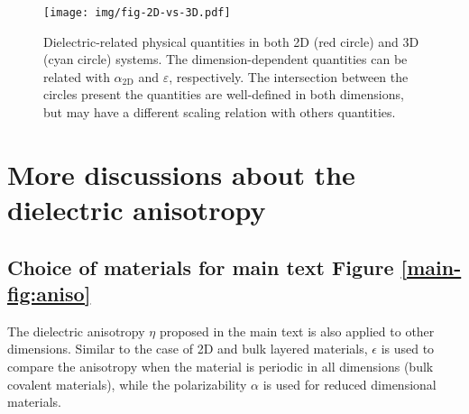 \documentclass[journal=ancac3,email=true,hyperref=true,keywords=false]{achemso}
\begin{document}
\begin{figure}[htbp]
\centering
\texttt{[image: img/fig-2D-vs-3D.pdf]}
\caption{\label{fig-2D-3D} Dielectric-related physical quantities in
  both 2D (red circle) and 3D (cyan circle) systems. The
  dimension-dependent quantities can be related with $\alpha_{\mathrm{2D}}$ and
  $\varepsilon$, respectively. The intersection between the circles
  present the quantities are well-defined in both dimensions, but may have a
  different scaling relation with others quantities.}
\end{figure}


\section{More discussions about the dielectric anisotropy}
\label{sec:aniso}

\subsection{Choice of materials for main text Figure \ref{main-fig:aniso}}
\label{ssec:aniso-materials}
The dielectric anisotropy $\eta$ proposed in the main text is also
applied to other dimensions. Similar to the case of 2D and bulk
layered materials, $\epsilon$ is used to compare the anisotropy when
the material is periodic in all dimensions (bulk covalent materials),
while the polarizability $\alpha$ is used for reduced dimensional
materials.
\end{document}
